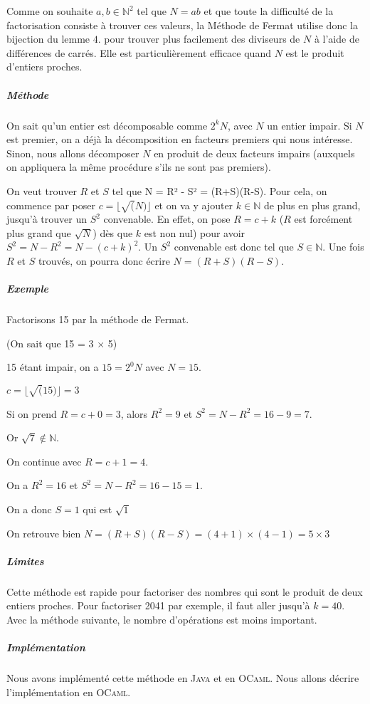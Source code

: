 \documentclass[11pt,a4paper]{article}
\begin{document}
	Comme on souhaite $a,b \in \mathbb{N}^2$ tel que $N = ab$ et que toute la difficulté de la factorisation consiste à trouver ces valeurs, la Méthode de Fermat utilise donc la bijection du lemme $4.$ pour trouver plus facilement des diviseurs de $N$ à l'aide de différences de carrés. Elle est particulièrement efficace quand $N$ est le produit d'entiers proches.
	
	\subparagraph{Méthode}
	On sait qu'un entier est décomposable comme $2^{k}N$, avec $N$ un entier impair. Si $N$ est premier, on a déjà la décomposition en facteurs premiers qui nous intéresse. Sinon, nous allons décomposer $N$ en produit de deux facteurs impairs (auxquels on appliquera la même procédure s'ils ne sont pas premiers). 
	
	On veut trouver $R$ et $S$ tel que N = R² - S² = (R+S)(R-S). 
	Pour cela, on commence par poser $c = \lfloor \sqrt(N)\rfloor$ et on va y ajouter $k \in \mathbb{N}$ de plus en plus grand, jusqu'à trouver un $S^2$ convenable. En effet, on pose $R = c + k$ ($R$ est forcément plus grand que  $\sqrt{N}$) dès que $k$ est non nul) pour avoir
	$S^{2} = N - R^{2} = N - (c+k)^{2}$.
	Un $S^2$ convenable est donc tel que $S \in \mathbb{N}$. Une fois $R$ et $S$ trouvés, on pourra donc écrire $N = (R+S)(R-S)$.
	
	\subparagraph{Exemple}
	Factorisons 15 par la méthode de Fermat. 
	
	(On sait que 15 = 3 $\times$  5)

	
	15 étant impair, on a $15 = 2^{0}N$ avec $N = 15$.
	
	$c = \lfloor \sqrt(15)\rfloor = 3$
	
	Si on prend $R = c + 0 = 3$, alors $R^2 = 9$ et $S^2 = N - R^2 = 16 - 9 = 7$. 
	
	Or $\sqrt{7} \not\in \mathbb{N}$. 
	
	On continue avec $R = c + 1 = 4$. 
	
	On a $R^2 = 16$ et $S^2 = N - R^2 = 16 - 15 = 1$.
	
	On a donc $S = 1$ qui est $\sqrt 1$
	
	On retrouve bien $N = (R+S)(R-S) = (4+1) \times (4-1) = 5 \times 3$
	
	\subparagraph{Limites}
	Cette méthode est rapide pour factoriser des nombres qui sont le produit de deux entiers proches. Pour factoriser 2041 par exemple, il faut aller jusqu'à $k = 40$. Avec la méthode suivante, le nombre d'opérations est moins important.
	
	\subparagraph{Implémentation}
	Nous avons implémenté cette méthode en \textsc{Java} et en \textsc{OCaml}. Nous allons décrire l'implémentation en \textsc{OCaml}.
\end{document}
